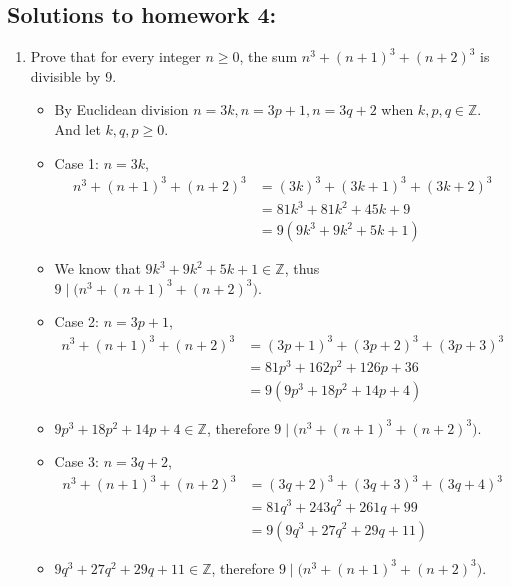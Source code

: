 \documentclass[letterpaper,12pt]{article}
\begin{document}
\subsection*{Solutions to homework 4:}

\begin{enumerate}
\item Prove that for every integer $n\geq 0$, the sum $n^3+(n+1)^3+(n+2)^3$ is divisible by 9.
\begin{itemize}
	\item By Euclidean division $n=3k, n=3p+1, n=3q+2 $ when $k,p,q \in \mathbb{Z}$. And let $k,q,p \geq 0$.
	\item Case 1: $n=3k$,
	\begin{align}
		n^3+(n+1)^3+(n+2)^3 &=(3k)^3+(3k+1)^3+(3k+2)^3 \\ 
		&= 81k^3+81k^2+45k+9 \\ &=9(9k^3+9k^2+5k+1)
	\end{align}
	\item We know that $9k^3+9k^2+5k+1 \in \mathbb{Z}$, thus $9 \mid \bigl(n^3+(n+1)^3+(n+2)^3\bigr)$.
	\item Case 2: $n=3p+1$,
	\begin{align}
		n^3+(n+1)^3+(n+2)^3 &= (3p+1)^3+(3p+2)^3+(3p+3)^3 \\
		&=81p^3+162p^2+126p+36 \\ &= 9(9p^3+18p^2+14p+4)
	\end{align}
	\item $9p^3+18p^2+14p+4 \in \mathbb{Z}$, therefore $9 \mid \bigl(n^3+(n+1)^3+(n+2)^3\bigr)$.
	\item Case 3: $n=3q+2$,
	\begin{align}
	n^3+(n+1)^3	+(n+2)^3 &= (3q+2)^3+(3q+3)^3+(3q+4)^3 \\
	&= 81q^3+243q^2+261q+99 \\ &=9(9q^3+27q^2+29q+11) 
	\end{align}
	\item $9q^3+27q^2+29q+11 \in \mathbb{Z}$, therefore $9 \mid \bigl(n^3+(n+1)^3+(n+2)^3\bigr)$.


\end{itemize}
\end{enumerate}
\end{document}
